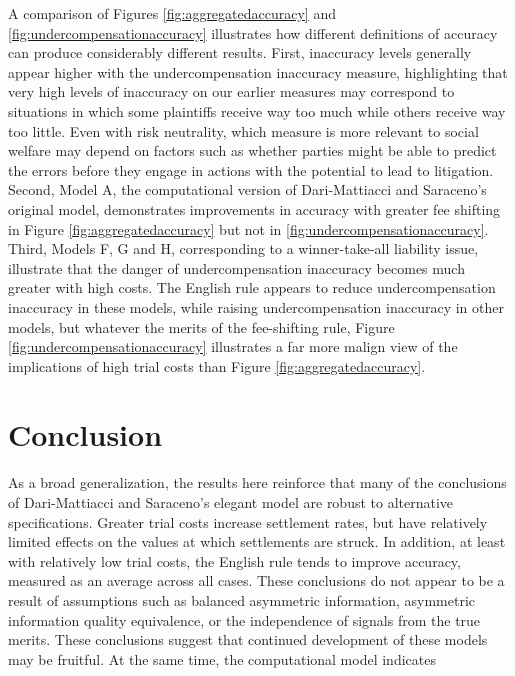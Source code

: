 \documentclass{article}
\begin{document}
A comparison of Figures \ref{fig:aggregatedaccuracy} and \ref{fig:undercompensationaccuracy} illustrates how different definitions of accuracy can produce considerably different results. First, inaccuracy levels generally appear higher with the undercompensation inaccuracy measure, highlighting that very high levels of inaccuracy on our earlier measures may correspond to situations in which some plaintiffs receive way too much while others receive way too little. Even with risk neutrality, which measure is more relevant to social welfare may depend on factors such as whether parties might be able to predict the errors before they engage in actions with the potential to lead to litigation. Second, Model A, the computational version of Dari-Mattiacci and Saraceno's original model, demonstrates improvements in accuracy with greater fee shifting in Figure \ref{fig:aggregatedaccuracy} but not in \ref{fig:undercompensationaccuracy}. Third, Models F, G and H, corresponding to a winner-take-all liability issue, illustrate that the danger of undercompensation inaccuracy becomes much greater with high costs. The English rule appears to reduce undercompensation inaccuracy in these models, while raising undercompensation inaccuracy in other models, but whatever the merits of the fee-shifting rule, Figure \ref{fig:undercompensationaccuracy} illustrates a far more malign view of the implications of high trial costs than Figure \ref{fig:aggregatedaccuracy}.

\section{Conclusion}

As a broad generalization, the results here reinforce that many of the conclusions of Dari-Mattiacci and Saraceno's elegant model are robust to alternative specifications. Greater trial costs increase settlement rates, but have relatively limited effects on the values at which settlements are struck. In addition, at least with relatively low trial costs, the English rule tends to improve accuracy, measured as an average across all cases. These conclusions do not appear to be a result of assumptions such as balanced asymmetric information, asymmetric information quality equivalence, or the independence of signals from the true merits. These conclusions suggest that continued development of these models may be fruitful. At the same time, the computational model indicates 

\printbibliography
\end{document}
